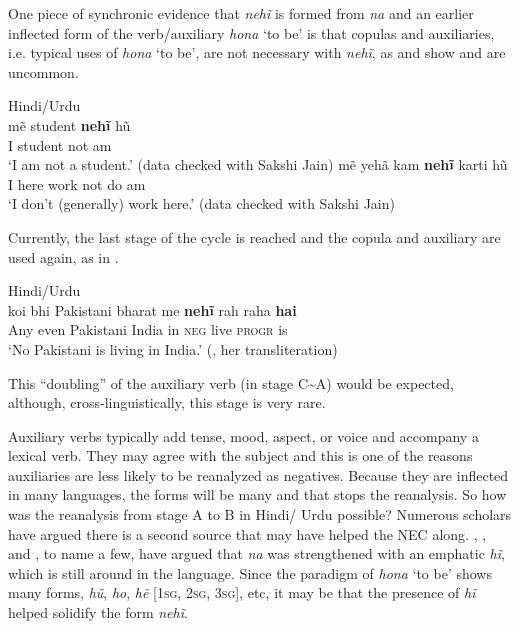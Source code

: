 \documentclass[output=paper,draft,draftmode,colorlinks,citecolor=brown]{langscibook}
\begin{document}
One piece of synchronic evidence that \textit{nehĩ} is formed from
\textit{na} and an earlier inflected  form of the verb\slash auxiliary
\textit{hona} `to be' is that copulas and auxiliaries, i.e.
typical uses of \textit{hona} `to be', are not necessary
with \textit{nehĩ}, as  and
 show and are uncommon.

\begin{exe}
    \ex Hindi\slash Urdu \label{ex:other-hindi-student}\\
    \gll mẽ  student    \textbf{nehĩ}   {\op}hũ{\cp}  \\
  I  student    not  am \\ \jambox{}
    \glt `I am not a student.' (data checked with Sakshi Jain)
    \ex\label{ex:other-hindi-work}
    \gll mẽ  yehã  kam  \textbf{nehĩ}  karti  {\op}hũ{\cp} \\
  I  here  work  not  do  am \\
    \glt `I don't (generally) work here.' (data checked with Sakshi Jain)
    \end{exe}
%
Currently, the last stage of the cycle is reached and the copula and
auxiliary are used again, as in .
%
\begin{exe}\ex Hindi\slash Urdu \label{ex:other-hindi-pakistani}\\
    \gll koi bhi Pakistani bharat me \textbf{nehĩ} rah raha \textbf{hai}\\
Any even Pakistani India in   \textsc{neg}   live   \textsc{progr}   is \\
    \glt `No Pakistani is living in India.' (\citealt[17]{Lampp2006}, her transliteration)
    \end{exe}
%
This ``doubling'' of the auxiliary verb (in stage C\textasciitilde{}A) would be expected,
although, cross-linguistically, this stage is very rare.

Auxiliary verbs typically add tense, mood, aspect, or voice and accompany a
lexical verb. They may agree with the subject and this is one of the
reasons auxiliaries are less likely to be reanalyzed as negatives. Because
they are inflected in many languages, the forms will be many and that stops
the reanalysis. So how was the reanalysis from stage A to B in Hindi\slash
Urdu possible? Numerous scholars have argued there is a second source that
may have helped the NEC along. \citet[413]{Whitney1889},
\citet[404]{Turner1966}, and \citet[7]{Bashir2006}, to name a few,  have
argued that \textit{na} was strengthened with an emphatic \textit{hĩ},
which is still around in the language. Since the paradigm of \textit{hona}
`to be' shows many forms, \textit{hũ}, \textit{ho}, \textit{hẽ} [\textsc{1sg, 2sg,
3sg}], etc, it may be that the presence of \textit{hĩ} helped solidify the
form \textit{nehĩ}.
\end{document}
